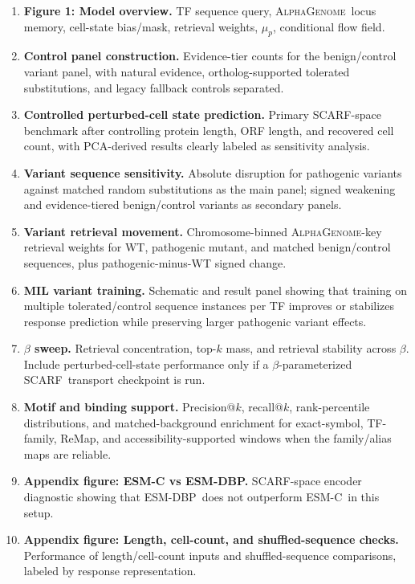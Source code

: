 \documentclass[11pt]{article}
\newcommand{\ag}{\textsc{AlphaGenome}}
\newcommand{\scarf}{\textsc{SCARF}}
\newcommand{\esm}{\textsc{ESM-C}}
\newcommand{\esmdbp}{\textsc{ESM-DBP}}
\begin{document}
\begin{enumerate}
    \item \textbf{Figure 1: Model overview.} TF sequence query, \ag\ locus memory, cell-state bias/mask, retrieval weights, \(\mu_p\), conditional flow field.
    \item \textbf{Control panel construction.} Evidence-tier counts for the benign/control variant panel, with natural evidence, ortholog-supported tolerated substitutions, and legacy fallback controls separated.
    \item \textbf{Controlled perturbed-cell state prediction.} Primary \scarf-space benchmark after controlling protein length, ORF length, and recovered cell count, with PCA-derived results clearly labeled as sensitivity analysis.
    \item \textbf{Variant sequence sensitivity.} Absolute disruption for pathogenic variants against matched random substitutions as the main panel; signed weakening and evidence-tiered benign/control variants as secondary panels.
    \item \textbf{Variant retrieval movement.} Chromosome-binned \ag-key retrieval weights for WT, pathogenic mutant, and matched benign/control sequences, plus pathogenic-minus-WT signed change.
    \item \textbf{MIL variant training.} Schematic and result panel showing that training on multiple tolerated/control sequence instances per TF improves or stabilizes response prediction while preserving larger pathogenic variant effects.
    \item \textbf{\(\beta\) sweep.} Retrieval concentration, top-\(k\) mass, and retrieval stability across \(\beta\). Include perturbed-cell-state performance only if a \(\beta\)-parameterized \scarf\ transport checkpoint is run.
    \item \textbf{Motif and binding support.} Precision@\(k\), recall@\(k\), rank-percentile distributions, and matched-background enrichment for exact-symbol, TF-family, ReMap, and accessibility-supported windows when the family/alias maps are reliable.
    \item \textbf{Appendix figure: ESM-C vs ESM-DBP.} \scarf-space encoder diagnostic showing that \esmdbp\ does not outperform \esm\ in this setup.
    \item \textbf{Appendix figure: Length, cell-count, and shuffled-sequence checks.} Performance of length/cell-count inputs and shuffled-sequence comparisons, labeled by response representation.
\end{enumerate}
\end{document}
